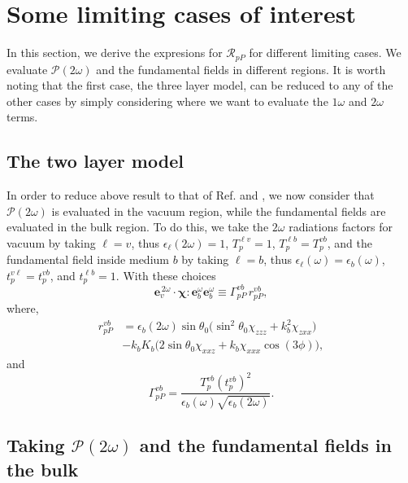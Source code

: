 \chapter{Some limiting cases of interest}

In this section, we derive the expresions for $\mathcal{R}_{pP}$ for different
limiting cases. We evaluate $\mathcal{P}(2\omega)$ and the fundamental fields in
different regions. It is worth noting that the first case, the three layer
model, can be reduced to any of the other cases by simply considering where we
want to evaluate the $1\omega$ and $2\omega$ terms.


\section{The two layer model}

In order to reduce above result to that of Ref. \cite{mizrahiJOSA88} and
\cite{sipePRB87}, we now consider that $\mathcal{P}(2\omega)$ is evaluated in
the vacuum region, while the fundamental fields are evaluated in the bulk
region. To do this, we take the $2\omega$ radiations factors for vacuum by
taking $\ell=v$, thus $\epsilon_{\ell}(2\omega)=1$, $T^{\ell v}_{p}=1$, $T^{\ell
b}_{p}=T^{vb}_{p}$, and the fundamental field inside medium $b$ by taking
$\ell=b$, thus $\epsilon_{\ell}(\omega)=\epsilon_{b}(\omega)$,
$t^{v\ell}_{p}=t^{vb}_{p}$, and $t^{\ell b}_{p}=1$. With these choices
\begin{equation*}\label{m800}
\mathbf{e}^{\,2\omega}_{v}\cdot\boldsymbol{\chi}:
\mathbf{e}^\omega_{b}\mathbf{e}^\omega_{b}
\equiv\Gamma^{vb}_{pP}\,r^{vb}_{pP}
,
\end{equation*}
where,
\begin{equation*}\label{m82}
\begin{split}
r^{vb}_{pP}
&= \epsilon_{b}(2\omega)\sin\theta_{0}
\Big(
\sin^2\theta_{0}\chi_{zzz} + k^{2}_{b}\chi_{zxx}
\Big)\\
&- k_{b}K_{b}
\Big(
2\sin\theta_{0}\chi_{xxz} + k_{b}\chi_{xxx}\cos(3\phi) 
\Big) 
,
\end{split}
\end{equation*}
and 
\begin{equation*}\label{m78}
\Gamma^{vb}_{pP}
= \frac{T^{v b}_{p}(t^{vb}_{p})^2}
       {\epsilon_{b}(\omega)\sqrt{\epsilon_{b}(2\omega)}}.
\end{equation*}


\section{Taking \texorpdfstring{$\mathcal{P}(2\omega)$}{P(2w)} and the
fundamental fields in the bulk}

